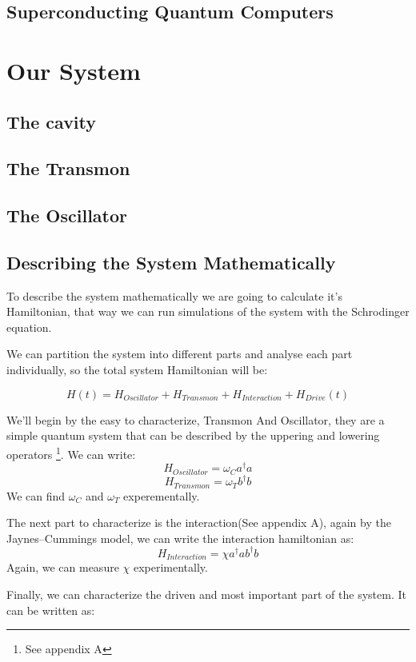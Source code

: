 \documentclass{article}
\numberwithin{equation}{section}
\begin{document}
\subsection{Superconducting Quantum Computers}

\newpage
\section{Our System}

\subsection{The cavity}

\subsection{The Transmon}

\subsection{The Oscillator}

\subsection{Describing the System Mathematically}  %
To describe the system mathematically we are going to calculate it's Hamiltonian, that way we can run simulations of the system with the Schrodinger equation.\par
We can partition the system into different parts and analyse each part individually, so the total system Hamiltonian will be:

\begin{equation}
H(t) = H_{Oscillator} + H_{Transmon}+ H_{Interaction} + H_{Drive}(t)
\end{equation}

We'll begin by the easy to characterize, Transmon And Oscillator, they are a simple quantum system that can be described by the uppering and lowering operators \footnote{See appendix A}. We can write:
\begin{equation}
H_{Oscillator} = \omega_C a^\dag{}a
\end{equation}
\begin{equation}
H_{Transmon} = \omega_T b^\dag{}b
\end{equation}
We can find $\omega_C$ and $\omega_T$ experementally. %
\par
The next part to characterize is the interaction(See appendix A), again by the Jaynes–Cummings model, we can write the interaction hamiltonian as:
\begin{equation}
H_{Interaction} = \chi a^\dag{} a  b^\dag{} b %
\end{equation}
Again, we can measure $\chi$ experimentally.  %
\par
Finally, we can characterize the driven and most important part of the system. It can be written as: %
\end{document}
